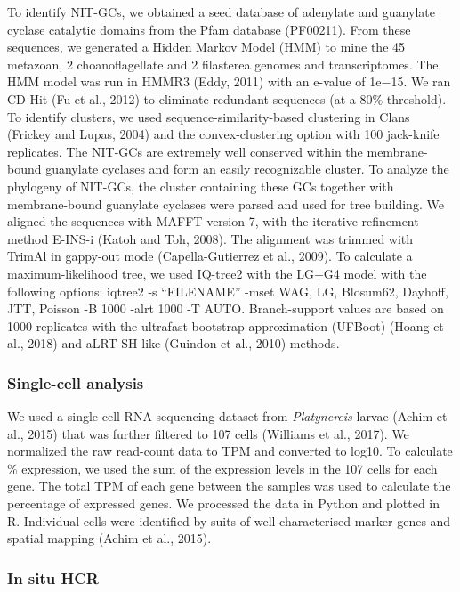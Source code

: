 \documentclass[
  11pt,
  letterpaper,
  DIV=11,
  numbers=noendperiod]{scrartcl}
\begin{document}
To identify NIT-GCs, we obtained a seed database of adenylate and
guanylate cyclase catalytic domains from the Pfam database (PF00211).
From these sequences, we generated a Hidden Markov Model (HMM) to mine
the 45 metazoan, 2 choanoflagellate and 2 filasterea genomes and
transcriptomes. The HMM model was run in HMMR3 (Eddy, 2011) with an
e-value of 1e−15. We ran CD-Hit (Fu et al., 2012) to eliminate redundant
sequences (at a 80\% threshold). To identify clusters, we used
sequence-similarity-based clustering in Clans (Frickey and Lupas, 2004)
and the convex-clustering option with 100 jack-knife replicates. The
NIT-GCs are extremely well conserved within the membrane-bound guanylate
cyclases and form an easily recognizable cluster. To analyze the
phylogeny of NIT-GCs, the cluster containing these GCs together with
membrane-bound guanylate cyclases were parsed and used for tree
building. We aligned the sequences with MAFFT version 7, with the
iterative refinement method E-INS-i (Katoh and Toh, 2008). The alignment
was trimmed with TrimAl in gappy-out mode (Capella-Gutierrez et al.,
2009). To calculate a maximum-likelihood tree, we used IQ-tree2 with the
LG+G4 model with the following options: iqtree2 -s ``FILENAME'' -mset
WAG, LG, Blosum62, Dayhoff, JTT, Poisson -B 1000 -alrt 1000 -T AUTO.
Branch-support values are based on 1000 replicates with the ultrafast
bootstrap approximation (UFBoot) (Hoang et al., 2018) and aLRT-SH-like
(Guindon et al., 2010) methods.

\subsubsection{Single-cell analysis}\label{single-cell-analysis}

We used a single-cell RNA sequencing dataset from \emph{Platynereis}
larvae (Achim et al., 2015) that was further filtered to 107 cells
(Williams et al., 2017). We normalized the raw read-count data to TPM
and converted to log10. To calculate \% expression, we used the sum of
the expression levels in the 107 cells for each gene. The total TPM of
each gene between the samples was used to calculate the percentage of
expressed genes. We processed the data in Python and plotted in R.
Individual cells were identified by suits of well-characterised marker
genes and spatial mapping (Achim et al., 2015).

\subsubsection{In situ HCR}\label{in-situ-hcr}
\end{document}
